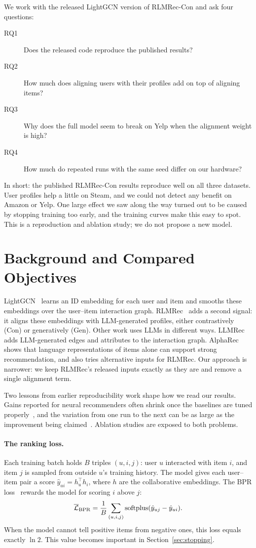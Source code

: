 \documentclass[runningheads]{llncs}
\begin{document}
We work with the released LightGCN version of RLMRec-Con and ask four
questions:
\begin{description}
\item[RQ1] Does the released code reproduce the published results?
\item[RQ2] How much does aligning users with their profiles add on top of
aligning items?
\item[RQ3] Why does the full model seem to break on Yelp when the alignment
weight is high?
\item[RQ4] How much do repeated runs with the same seed differ on our hardware?
\end{description}
In short: the published RLMRec-Con results reproduce well on all three
datasets. User profiles help a little on Steam, and we could not detect any
benefit on Amazon or Yelp. One large effect we saw along the way turned out to
be caused by stopping training too early, and the training curves make this
easy to spot. This is a reproduction and ablation study; we do not propose a
new model.

\section{Background and Compared Objectives}
LightGCN~\cite{lightgcn} learns an ID embedding for each user and item and
smooths these embeddings over the user--item interaction graph.
RLMRec~\cite{rlmrec} adds a second signal: it aligns these embeddings with
LLM-generated profiles, either contrastively (Con) or generatively (Gen).
Other work uses LLMs in different ways. LLMRec~\cite{llmrec} adds
LLM-generated edges and attributes to the interaction graph.
AlphaRec~\cite{alpharec} shows that language representations of items alone
can support strong recommendation, and also tries alternative inputs for
RLMRec. Our approach is narrower: we keep RLMRec's released inputs exactly as
they are and remove a single alignment term.

Two lessons from earlier reproducibility work shape how we read our results.
Gains reported for neural recommenders often shrink once the baselines are
tuned properly~\cite{dacrema,rendle-baselines}, and the variation from one
run to the next can be as large as the improvement being
claimed~\cite{bouthillier}. Ablation studies are exposed to both problems.

\paragraph{The ranking loss.}
Each training batch holds $B$ triples $(u,i,j)$: user $u$ interacted with item
$i$, and item $j$ is sampled from outside $u$'s training history. The model
gives each user--item pair a score $\hat y_{ui}=h_u^\top h_i$, where $h$ are
the collaborative embeddings. The BPR loss~\cite{bpr} rewards the model for
scoring $i$ above $j$:
\begin{equation}
 \overline{\mathcal L}_{\rm BPR}=\frac{1}{B}\sum_{(u,i,j)}
 \operatorname{softplus}(\hat y_{uj}-\hat y_{ui}).
\end{equation}
When the model cannot tell positive items from negative ones, this loss equals
exactly $\ln 2$. This value becomes important in Section~\ref{sec:stopping}.
\end{document}
